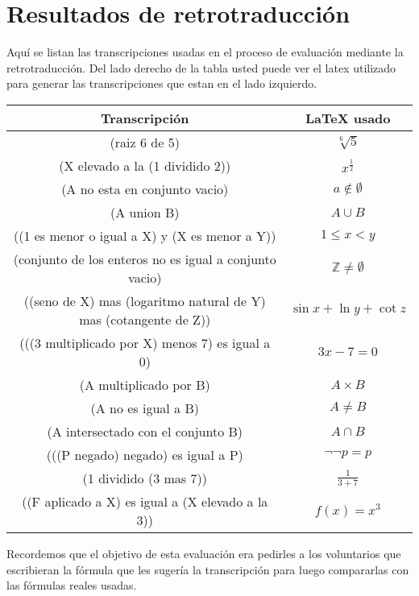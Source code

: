 \chapter{Resultados de retrotraducción}

\label{AppendixC}

Aquí se listan las transcripciones usadas en el proceso de evaluación mediante la retrotraducción.
Del lado derecho de la tabla usted puede ver el latex utilizado para generar las transcripciones que estan en el lado izquierdo.

\begin{center}
 \begin{tabular}{||c  c||}
    \hline
    Transcripción & LaTeX usado \\ [0.5ex]
    \hline\hline
    (raiz 6 de 5) & $\sqrt[6]{5}$ \\ 
    \hline
    (X elevado a la (1 dividido 2))& $x^\frac{1}{2}$ \\
    \hline
    (A no esta en conjunto vacio)& $a \not\in \emptyset$ \\
    \hline
    (A union B)& $A \cup B$ \\
    \hline
    ((1 es menor o igual a X) y (X es menor a Y))& $1\leq x < y$ \\
    \hline
    (conjunto de los enteros no es igual a conjunto vacio)& $\mathbb{Z} \neq \emptyset$ \\
    \hline
    ((seno de X) mas (logaritmo natural de Y) mas (cotangente de Z))& $\sin x + \ln y + \cot z$ \\
    \hline
    (((3 multiplicado por X) menos 7) es igual a 0)& $3x - 7 = 0$ \\
    \hline
    (A multiplicado por B)& $A \times B$ \\
    \hline
    (A no es igual a B)& $A \neq B$ \\
    \hline
    (A intersectado con el conjunto B)& $A \cap B$ \\
    \hline
    (((P negado) negado) es igual a P)& $\lnot \lnot p = p$ \\
    \hline
    (1 dividido (3 mas 7))& $\frac{1}{3+7}$ \\
    \hline
    ((F aplicado a X) es igual a (X elevado a la 3)) & $f(x) = x^3$ \\[1ex]
 \hline
\end{tabular}
\end{center}

Recordemos que el objetivo de esta evaluación era pedirles a los voluntarios que escribieran la fórmula que les sugería la transcripción para luego compararlas con las fórmulas reales usadas.

